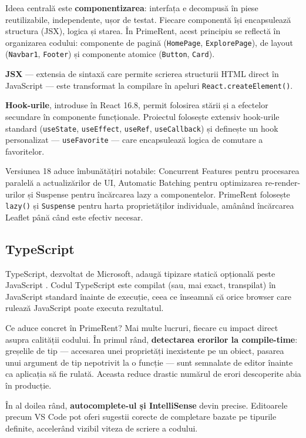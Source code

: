 \documentclass[12pt,a4paper,oneside]{report}
\begin{document}
Ideea centrală este \textbf{componentizarea}: interfața e decompusă în piese reutilizabile, independente, ușor de testat. Fiecare componentă își encapsulează structura (JSX), logica și starea. În PrimeRent, acest principiu se reflectă în organizarea codului: componente de pagină (\texttt{HomePage}, \texttt{ExplorePage}), de layout (\texttt{Navbar1}, \texttt{Footer}) și componente atomice (\texttt{Button}, \texttt{Card}).

\textbf{JSX} — extensia de sintaxă care permite scrierea structurii HTML direct în JavaScript — este transformat la compilare în apeluri \texttt{React.createElement()}.

\textbf{Hook-urile}, introduse în React 16.8, permit folosirea stării și a efectelor secundare în componente funcționale. Proiectul folosește extensiv hook-urile standard (\texttt{useState}, \texttt{useEffect}, \texttt{useRef}, \texttt{useCallback}) și definește un hook personalizat — \texttt{useFavorite} — care encapsulează logica de comutare a favoritelor.

Versiunea 18 aduce îmbunătățiri notabile: Concurrent Features pentru procesarea paralelă a actualizărilor de UI, Automatic Batching pentru optimizarea re-render-urilor și Suspense pentru încărcarea lazy a componentelor. PrimeRent folosește \texttt{lazy()} și \texttt{Suspense} pentru harta proprietăților individuale, amânând încărcarea Leaflet până când este efectiv necesar.

\subsection{TypeScript}

TypeScript, dezvoltat de Microsoft, adaugă tipizare statică opțională peste JavaScript \cite{typescript}. Codul TypeScript este compilat (sau, mai exact, transpilat) în JavaScript standard înainte de execuție, ceea ce înseamnă că orice browser care rulează JavaScript poate executa rezultatul.

Ce aduce concret în PrimeRent? Mai multe lucruri, fiecare cu impact direct asupra calității codului. În primul rând, \textbf{detectarea erorilor la compile-time}: greșelile de tip — accesarea unei proprietăți inexistente pe un obiect, pasarea unui argument de tip nepotrivit la o funcție — sunt semnalate de editor înainte ca aplicația să fie rulată. Aceasta reduce drastic numărul de erori descoperite abia în producție.

În al doilea rând, \textbf{autocomplete-ul și IntelliSense} devin precise. Editoarele precum VS Code pot oferi sugestii corecte de completare bazate pe tipurile definite, accelerând vizibil viteza de scriere a codului.
\end{document}
